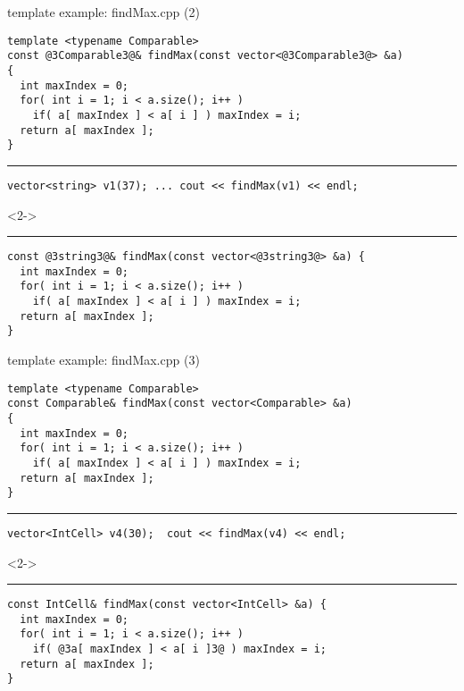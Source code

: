 \begin{frame}[fragile,label=findMax2]{template example: findMax.cpp (2)}
\begin{lstlisting}
template <typename Comparable>
const @3Comparable3@& findMax(const vector<@3Comparable3@> &a)
{
  int maxIndex = 0; 
  for( int i = 1; i < a.size(); i++ ) 
    if( a[ maxIndex ] < a[ i ] ) maxIndex = i; 
  return a[ maxIndex ]; 
}
\end{lstlisting}
\hrule
\begin{lstlisting}
vector<string> v1(37); ... cout << findMax(v1) << endl;
\end{lstlisting}
\begin{visibleenv}<2->
\hrule
\begin{lstlisting}
const @3string3@& findMax(const vector<@3string3@> &a) {
  int maxIndex = 0; 
  for( int i = 1; i < a.size(); i++ ) 
    if( a[ maxIndex ] < a[ i ] ) maxIndex = i; 
  return a[ maxIndex ]; 
}
\end{lstlisting}
\end{visibleenv}
\end{frame}

\begin{frame}[fragile,label=findMax3]{template example: findMax.cpp (3)}
\begin{lstlisting}
template <typename Comparable>
const Comparable& findMax(const vector<Comparable> &a)
{
  int maxIndex = 0; 
  for( int i = 1; i < a.size(); i++ ) 
    if( a[ maxIndex ] < a[ i ] ) maxIndex = i; 
  return a[ maxIndex ]; 
}
\end{lstlisting}
\hrule
\begin{lstlisting}
vector<IntCell> v4(30);  cout << findMax(v4) << endl;
\end{lstlisting}
\begin{visibleenv}<2->
\hrule
\begin{lstlisting}
const IntCell& findMax(const vector<IntCell> &a) {
  int maxIndex = 0; 
  for( int i = 1; i < a.size(); i++ ) 
    if( @3a[ maxIndex ] < a[ i ]3@ ) maxIndex = i; 
  return a[ maxIndex ]; 
}
\end{lstlisting}
\end{visibleenv}
\end{frame}

